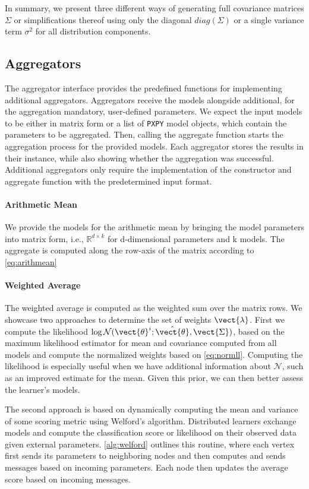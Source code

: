 In summary, we present three different ways of generating full covariance matrices $\Sigma$ or simplifications thereof using only the diagonal $diag(\Sigma)$ or a single variance term $\sigma^2$ for all distribution components.
\subsection{Aggregators}

The aggregator interface provides the predefined functions for implementing additional aggregators.
Aggregators receive the models alongside additional, for the aggregation mandatory, user-defined parameters.
We expect the input models to be either in matrix form or a list of \texttt{PXPY} model objects, which contain the parameters to be aggregated.
Then, calling the aggregate function starts the aggregation process for the provided models. 
Each aggregator stores the results in their instance, while also showing whether the aggregation was successful.
Additional aggregators only require the implementation of the constructor and aggregate function with the predetermined input format.

\paragraph*{Arithmetic Mean}
We provide the models for the arithmetic mean by bringing the model parameters into matrix form, i.e., $\mathbb{R}^{d \times k}$ for d-dimensional parameters and k models.
The aggregate is computed along the row-axis of the matrix according to \autoref{eq:arithmean}

\paragraph*{Weighted Average}
The weighted average is computed as the weighted sum over the matrix rows.
We showcase two approaches to determine the set of weights $\vect{\lambda}$.
First we compute the likelihood $\log \mathcal{N}(\vect{\theta}^i; \hat{\vect{\theta}}, \vect{\Sigma})$, based on the maximum likelihood estimator for mean and covariance computed from all models and compute the normalized weights based on \autoref{eq:normll}.
Computing the likelihood is especially useful when we have additional information about $\mathcal{N}$, such as an improved estimate for the mean. 
Given this prior, we can then better assess the learner's models.

The second approach is based on dynamically computing the mean and variance of some scoring metric using Welford's algorithm.
Distributed learners exchange models and compute the classification score or likelihood on their observed data given external parameters.
\autoref{alg:welford} outlines this routine, where each vertex first sends its parameters to neighboring nodes and then computes and sends messages based on incoming parameters. 
Each node then updates the average score based on incoming messages.

